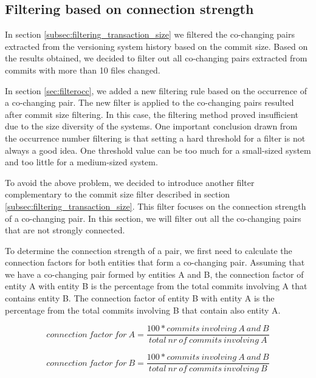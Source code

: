 


\subsection{Filtering based on connection strength}
\label{sec:filterstrength}

In section \ref{subsec:filtering_transaction_size} we filtered the co-changing pairs extracted from the versioning system history based on the commit size. Based on the results obtained, we decided to filter out all co-changing pairs extracted from commits with more than 10 files changed. 

In section \ref{sec:filterocc}, we added a new filtering rule based on the occurrence of a co-changing pair. The new filter is applied to the co-changing pairs resulted after commit size filtering. In this case, the filtering method proved insufficient due to the size diversity of the systems. One important conclusion drawn from the occurrence number filtering is that setting a hard threshold for a filter is not always a good idea. One threshold value can be too much for a small-sized system and too little for a medium-sized system. 

To avoid the above problem, we decided to introduce another filter complementary to the commit size filter described in section \ref{subsec:filtering_transaction_size}.
This filter focuses on the connection strength of a co-changing pair. In this section, we will filter out all the co-changing pairs that are not strongly connected.

To determine the connection strength of a pair, we first need to calculate the connection factors for both entities that form a co-changing pair.
Assuming that we have a co-changing pair formed by entities A and B, the connection factor of entity A with entity B is the percentage from the total commits involving A that contains entity B. The connection factor of entity B with entity A is the percentage from the total commits involving B that contain also entity A.

\begin{equation}
 connection\ factor\ for\ A = \frac{100 * commits\ involving\ A\ and\ B}{total\ nr\ of\ commits\ involving\ A}
\end{equation}

\begin{equation}
 connection\ factor\ for\ B = \frac{100 * commits\ involving\ A\ and\ B}{total\ nr\ of\ commits\ involving\ B}
\end{equation}

